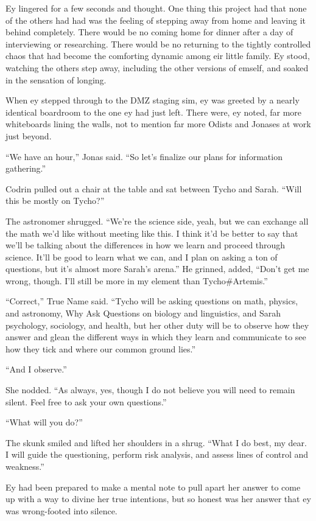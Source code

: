 Ey lingered for a few seconds and thought. One thing this project had that none of the others had had was the feeling of stepping away from home and leaving it behind completely. There would be no coming home for dinner after a day of interviewing or researching. There would be no returning to the tightly controlled chaos that had become the comforting dynamic among eir little family. Ey stood, watching the others step away, including the other versions of emself, and soaked in the sensation of longing.

When ey stepped through to the DMZ staging sim, ey was greeted by a nearly identical boardroom to the one ey had just left. There were, ey noted, far more whiteboards lining the walls, not to mention far more Odists and Jonases at work just beyond.

``We have an hour,'' Jonas said. ``So let's finalize our plans for information gathering.''

Codrin pulled out a chair at the table and sat between Tycho and Sarah. ``Will this be mostly on Tycho?''

The astronomer shrugged. ``We're the science side, yeah, but we can exchange all the math we'd like without meeting like this. I think it'd be better to say that we'll be talking about the differences in how we learn and proceed through science. It'll be good to learn what we can, and I plan on asking a ton of questions, but it's almost more Sarah's arena.'' He grinned, added, ``Don't get me wrong, though. I'll still be more in my element than Tycho\#Artemis.''

``Correct,'' True Name said. ``Tycho will be asking questions on math, physics, and astronomy, Why Ask Questions on biology and linguistics, and Sarah psychology, sociology, and health, but her other duty will be to observe how they answer and glean the different ways in which they learn and communicate to see how they tick and where our common ground lies.''

``And I observe.''

She nodded. ``As always, yes, though I do not believe you will need to remain silent. Feel free to ask your own questions.''

``What will you do?''

The skunk smiled and lifted her shoulders in a shrug. ``What I do best, my dear. I will guide the questioning, perform risk analysis, and assess lines of control and weakness.''

Ey had been prepared to make a mental note to pull apart her answer to come up with a way to divine her true intentions, but so honest was her answer that ey was wrong-footed into silence.

